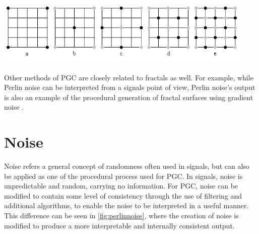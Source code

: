 \documentclass[10pt]{report}
\begin{document}
		\begin{minipage}{\textwidth}
			\centering
			\includegraphics[scale=1.0]{diamond_square}
			\label{fig:diamond_square}
		\end{minipage}
		
		Other methods of PGC are closely related to fractals as well. For example, while Perlin noise can be interpreted from a signals point of view, Perlin noise's output is also an example of the procedural generation of fractal surfaces using gradient noise \cite{fractal-landscapes}.
		
	\vspace{10pt}
	\let\clearpage\relax
	\chapter{Noise}
		Noise refers a general concept of randomness often used in signals, but can also be applied as one of the procedural process used for PGC. In signals, noise is unpredictable and random, carrying no information. For PGC, noise can be modified to contain some level of consistency through the use of filtering and additional algorithms, to enable the noise to be interpreted in a useful manner. This difference can be seen in \autoref{fig:perlinnoise}, where the creation of noise is modified to produce a more interpretable and internally consistent output. 
		
\end{document}
